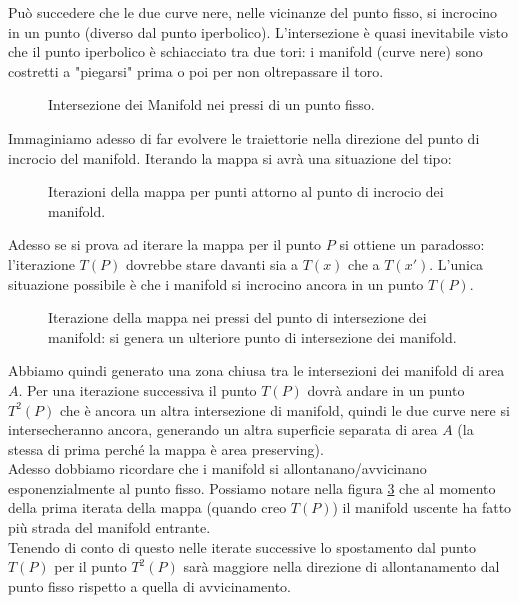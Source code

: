 \noindent
Può succedere che le due curve nere, nelle vicinanze del punto fisso, si incrocino in un punto (diverso dal punto iperbolico). L'intersezione è quasi inevitabile visto che il punto iperbolico è schiacciato tra due tori: i manifold (curve nere) sono costretti a "piegarsi" prima o poi per non oltrepassare il toro.
\begin{figure}[H]
    \centering
    \caption{\scriptsize Intersezione dei Manifold nei pressi di un punto fisso.}
    \label{fig:19_intersezione}
\end{figure}
\noindent
Immaginiamo adesso di far evolvere le traiettorie nella direzione del punto di incrocio del manifold. Iterando la mappa si avrà una situazione del tipo:
\begin{figure}[H]
    \centering
    \caption{\scriptsize Iterazioni della mappa per punti attorno al punto di incrocio dei manifold.}
    \label{fig:19_itero_fisso}
\end{figure}
\noindent
Adesso se si prova ad iterare la mappa per il punto $P$  si ottiene un paradosso: l'iterazione $T(P)$  dovrebbe stare davanti sia a $T(x)$  che a $T(x')$.
L'unica situazione possibile è che i manifold si incrocino ancora in un punto $T(P)$.
\begin{figure}[H]
    \centering
    \caption{\scriptsize Iterazione della mappa nei pressi del punto di intersezione dei manifold: si genera un ulteriore punto di intersezione dei manifold.}
    \label{fig:19_manifold_incrocio1}
\end{figure}
\noindent
Abbiamo quindi generato una zona chiusa tra le intersezioni dei manifold di area $A$.
Per una iterazione successiva il punto $T(P)$ dovrà andare in un punto $T^2(P)$ che è ancora un altra intersezione di manifold, quindi le due curve nere si intersecheranno ancora, generando un altra superficie separata di area $A$ (la stessa di prima perché la mappa è area preserving).\\
Adesso dobbiamo ricordare che i manifold si allontanano/avvicinano esponenzialmente al punto fisso. Possiamo notare nella figura \ref{fig:19_manifold_incrocio1} che al momento della prima iterata della mappa (quando creo $T(P)$) il manifold uscente ha fatto più strada del manifold entrante.\\
Tenendo di conto di questo nelle iterate successive lo spostamento dal punto $T(P)$ per il punto $T^2(P)$ sarà maggiore nella direzione di allontanamento dal punto fisso rispetto a quella di avvicinamento.\\
